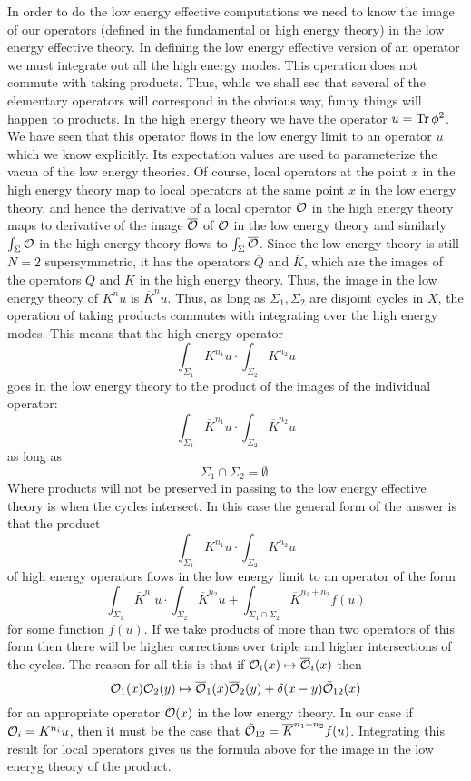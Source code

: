 \documentclass[10pt]{article}
\def\ov{\overline}
\begin{document}
In order to do the low energy effective computations we need to know
the image of our operators (defined in the fundamental or high energy
theory) in the low energy effective theory. 
In defining the low energy effective version of
an operator we must integrate out all the high energy modes. This
operation  does not commute with taking products.  Thus, while we
shall see that several of the
elementary operators will correspond in the obvious way, funny things
will happen to products. 
In the high energy theory we have the operator $u={\rm
Tr}\,\phi^2$. We have seen that this operator flows in the low energy
limit to an operator $u$ which we know explicitly.  Its expectation
values are used to parameterize the vacua of the low energy theories. 
Of course, local operators at the point $x$ in the high energy theory
map to local operators at the same point $x$ in the low energy theory,
and hence the 
derivative of a local operator ${\cal O}$ in the high energy theory
maps to derivative of the image $\ov{{\cal O}}$ of ${\cal O}$ in the
low energy theory and similarly $\int_{\Sigma}{\cal O}$ in the high
energy theory flows to $\int_\Sigma\ov{\cal O}$.   
Since the low
energy theory is still $N=2$ supersymmetric, it has the operators $\ov Q$
and  $\ov K$,
which are the images of the operators $Q$ and $K$ in the high energy theory.
Thus,  the image in the low energy theory of $K^nu$ is $\ov K^nu$.
Thus, as long as $\Sigma_1,\Sigma_2$ are disjoint cycles in $X$, the
operation of taking products commutes with integrating over the high
energy modes. This means that 
the high energy operator
$$\int_{\Sigma_1}K^{n_1}u\cdot \int_{\Sigma_2}K^{n_2}u$$
goes in the low energy theory to the product of the images of the
individual operator: 
$$\int_{\Sigma_1}\ov K^{n_1}u\cdot \int_{\Sigma_2}\ov K^{n_2}u$$
as long as
$$\Sigma_1\cap\Sigma_2=\emptyset.$$
Where products will not be preserved in passing to the low energy
effective theory is when the cycles intersect. 
In this case the general form of the answer is that the product
$$\int_{\Sigma_1}K^{n_1}u\cdot \int_{\Sigma_2}K^{n_2}u$$
of high energy operators flows in the low energy limit to  an operator
of the form 
$$\int_{\Sigma_1}\ov K^{n_1}u\cdot
\int_{\Sigma_2}\ov K^{n_2}u+\int_{\Sigma_1\cap\Sigma_2} \ov K^{n_1+n_2}f(u)$$ 
for some function $f(u)$.  
If we take products of more than two operators of this form then there
will be higher corrections
over triple and higher intersections of the cycles.
The reason for all this is that if ${\cal O}_i(x)\mapsto \ov{\cal
O}_i(x)$ then 
$${\cal O}_1(x){\cal O}_2(y)\mapsto \ov{\cal O}_1(x)\ov{\cal
O}_2(y)+\delta(x-y)\tilde {\cal O}_{12}(x)$$
for an appropriate operator $\tilde {\cal O}(x)$ in the low energy
theory. 
In our case if ${\cal O}_i=K^{n_i}u$, then  it must be
the case that $\tilde {\cal O}_{12}=\ov K^{n_1+n_2}f(u)$.
Integrating this result for local operators gives us the formula above
for the image in the low eneryg theory of the product.
\end{document}

